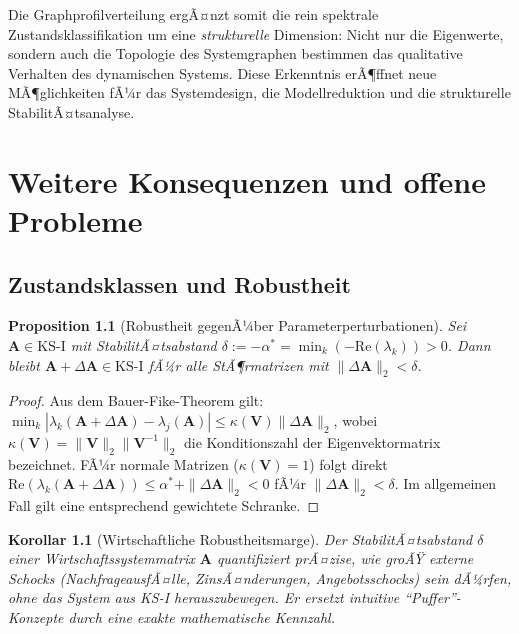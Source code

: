 ﻿\documentclass[12pt, a4paper, titlepage]{report}
\newtheorem{proposition}[theorem]{Proposition}
\newtheorem{corollary}[theorem]{Korollar}
\theoremstyle{definition}
\theoremstyle{remark}
\newcommand{\vA}{\bm{A}}
\newcommand{\vV}{\bm{V}}
\newcommand{\re}{\mathrm{Re}}
\newcommand{\KS}{\mathrm{KS}}
\begin{document}
Die Graphprofilverteilung ergÃ¤nzt somit die rein spektrale Zustandsklassifikation
um eine \emph{strukturelle} Dimension: Nicht nur die Eigenwerte, sondern auch die
Topologie des Systemgraphen bestimmen das qualitative Verhalten des dynamischen Systems.
Diese Erkenntnis erÃ¶ffnet neue MÃ¶glichkeiten fÃ¼r das Systemdesign, die
Modellreduktion und die strukturelle StabilitÃ¤tsanalyse.

\chapter{Weitere Konsequenzen und offene Probleme}
\label{sec:konsequenzen}

\section{Zustandsklassen und Robustheit}

\begin{proposition}[Robustheit gegenÃ¼ber Parameterperturbationen]
\label{prop:robustheit}
Sei $\vA \in \KS\text{-I}$ mit StabilitÃ¤tsabstand
$\delta := -\alpha^* = \min_k(-\re(\lambda_k)) > 0$. Dann bleibt $\vA + \Delta\vA \in \KS\text{-I}$
fÃ¼r alle StÃ¶rmatrizen mit $\|\Delta\vA\|_2 < \delta$.
\end{proposition}

\begin{proof}
Aus dem Bauer-Fike-Theorem gilt: $\min_{k}|\lambda_k(\vA+\Delta\vA) - \lambda_j(\vA)| \leq \kappa(\vV)\|\Delta\vA\|_2$,
wobei $\kappa(\vV) = \|\vV\|_2\|\vV^{-1}\|_2$ die Konditionszahl der Eigenvektormatrix
bezeichnet. FÃ¼r normale Matrizen ($\kappa(\vV)=1$) folgt direkt
$\re(\lambda_k(\vA+\Delta\vA)) \leq \alpha^* + \|\Delta\vA\|_2 < 0$
fÃ¼r $\|\Delta\vA\|_2 < \delta$. Im allgemeinen Fall gilt eine entsprechend gewichtete
Schranke. \qedhere
\end{proof}

\begin{corollary}[Wirtschaftliche Robustheitsmarge]
Der StabilitÃ¤tsabstand $\delta$ einer Wirtschaftssystemmatrix $\vA$ quantifiziert
prÃ¤zise, wie groÃŸ externe Schocks (NachfrageausfÃ¤lle, ZinsÃ¤nderungen, Angebotsschocks)
sein dÃ¼rfen, ohne das System aus KS-I herauszubewegen. Er ersetzt intuitive
``Puffer''-Konzepte durch eine exakte mathematische Kennzahl.
\end{corollary}
\end{document}
